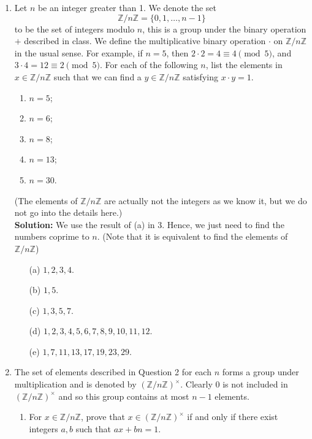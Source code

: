 \begin{enumerate}
    \item Let $n$ be an integer greater than 1. We denote the set
    \[
    \mathbb{Z}/n\mathbb{Z} = \{ 0,1,\dots,n-1 \}
    \]
    to be the set of integers modulo $n$, this is a group under the binary operation $+$
    described in class. We define the multiplicative binary operation $\cdot$ on
    $\mathbb{Z}/n\mathbb{Z}$ in the usual sense. For example, if $n=5$, then
    $2\cdot 2 = 4 \equiv 4 \pmod{5}$, and $3 \cdot 4 = 12 \equiv 2 \pmod{5}$.
    For each of the following $n$, list the elements in $x \in \mathbb{Z}/n\mathbb{Z}$
    such that we can find a $y \in \mathbb{Z}/n\mathbb{Z}$ satisfying $x \cdot y = 1$.
    \begin{enumerate}
        \item $n=5$;
        \item $n=6$;
        \item $n=8$;
        \item $n=13$;
        \item $n=30$.
    \end{enumerate}
    (The elements of $\mathbb{Z}/n\mathbb{Z}$ are actually not the integers as we know it,
    but we do not go into the details here.) \\
    \textbf{Solution:} We use the result of (a) in 3. Hence, we just need to find the numbers coprime to \(n\). (Note that it is equivalent to find the elements of \(\mathbb{Z} / n \mathbb{Z} \))
    \begin{itemize}
        \item [(a)] \(1,2,3,4\). 
        \item [(b)] \(1, 5\). 
        \item [(c)] \(1,3,5,7\). 
        \item [(d)] \(1,2,3,4,5,6,7,8,9,10,11,12\). 
        \item [(e)] \(1,7,11,13,17,19,23,29\).     
    \end{itemize} 
    \item The set of elements described in Question 2 for each $n$ forms a group under
    multiplication and is denoted by $(\mathbb{Z}/n\mathbb{Z})^\times$. Clearly $0$
    is not included in $(\mathbb{Z}/n\mathbb{Z})^\times$ and so this group contains
    at most $n-1$ elements.
    \begin{enumerate}
        \item For $x \in \mathbb{Z}/n\mathbb{Z}$, prove that $x \in (\mathbb{Z}/n\mathbb{Z})^\times$
              if and only if there exist integers $a,b$ such that $ax + bn = 1$.

\end{enumerate}
\end{enumerate}
